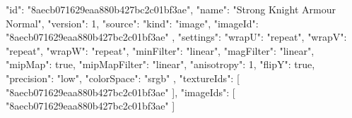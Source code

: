 {
  "id": "8aecb071629eaa880b427bc2c01bf3ae",
  "name": "Strong Knight Armour Normal",
  "version": 1,
  "source": {
    "kind": "image",
    "imageId": "8aecb071629eaa880b427bc2c01bf3ae"
  },
  "settings": {
    "wrapU": "repeat",
    "wrapV": "repeat",
    "wrapW": "repeat",
    "minFilter": "linear",
    "magFilter": "linear",
    "mipMap": true,
    "mipMapFilter": "linear",
    "anisotropy": 1,
    "flipY": true,
    "precision": "low",
    "colorSpace": "srgb"
  },
  "textureIds": [
    "8aecb071629eaa880b427bc2c01bf3ae"
  ],
  "imageIds": [
    "8aecb071629eaa880b427bc2c01bf3ae"
  ]
}
